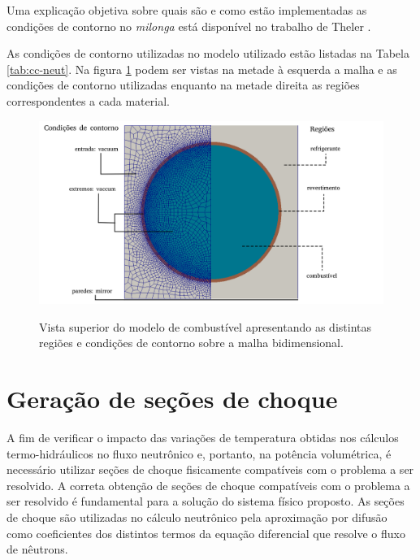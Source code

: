 Uma explicação objetiva sobre quais são e como estão
implementadas as condições de contorno no \textit{milonga} está disponível
no trabalho de Theler \cite{Theler2013b}.

As condições de contorno utilizadas no modelo utilizado estão listadas na Tabela
\ref{tab:cc-neut}. Na figura \ref{fig:cc-neut} podem ser vistas na metade à esquerda
a malha e as condições de contorno utilizadas enquanto na metade direita as
regiões correspondentes a cada material.


\begin{figure}[htb]
  \caption{Vista superior do modelo de combustível apresentando as distintas regiões e condições de contorno
    sobre a malha bidimensional.}
  \centering\includegraphics[scale=0.52]{figuras/regions_neutronica_malha_e_sem_portugues.png}
  \label{fig:cc-neut}
\end{figure}


\section{Geração de seções de choque}
\label{sec:gerxs}

A fim de verificar o impacto das variações de temperatura obtidas nos cálculos
termo-hidráulicos no fluxo
neutrônico e, portanto, na potência volumétrica, é necessário utilizar seções de choque
fisicamente compatíveis com o problema a ser resolvido. A correta obtenção de seções
de choque compatíveis com o problema a ser resolvido é fundamental para a solução
do sistema físico proposto. As seções de choque são utilizadas no cálculo neutrônico
pela aproximação por difusão como coeficientes dos distintos termos da equação
diferencial que resolve o fluxo de nêutrons.

